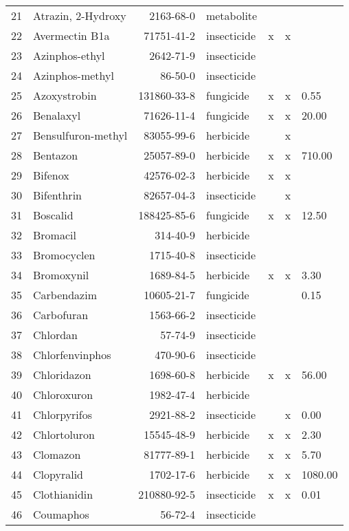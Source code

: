 \begin{longtable}{lp{3cm}rlp{0.5cm}p{0.5cm}p{1cm}}
  21 & Atrazin, 2-Hydroxy & 2163-68-0 & metabolite &  &  &  \\ 
  22 & Avermectin B1a & 71751-41-2 & insecticide & x & x &  \\ 
  23 & Azinphos-ethyl & 2642-71-9 & insecticide &  &  &  \\ 
  24 & Azinphos-methyl & 86-50-0 & insecticide &  &  &  \\ 
  25 & Azoxystrobin & 131860-33-8 & fungicide & x & x & 0.55 \\ 
  26 & Benalaxyl & 71626-11-4 & fungicide & x & x & 20.00 \\ 
  27 & Bensulfuron-methyl & 83055-99-6 & herbicide &  & x &  \\ 
  28 & Bentazon & 25057-89-0 & herbicide & x & x & 710.00 \\ 
  29 & Bifenox & 42576-02-3 & herbicide & x & x &  \\ 
  30 & Bifenthrin & 82657-04-3 & insecticide &  & x &  \\ 
  31 & Boscalid & 188425-85-6 & fungicide & x & x & 12.50 \\ 
  32 & Bromacil & 314-40-9 & herbicide &  &  &  \\ 
  33 & Bromocyclen & 1715-40-8 & insecticide &  &  &  \\ 
  34 & Bromoxynil & 1689-84-5 & herbicide & x & x & 3.30 \\ 
  35 & Carbendazim & 10605-21-7 & fungicide &  &  & 0.15 \\ 
  36 & Carbofuran & 1563-66-2 & insecticide &  &  &  \\ 
  37 & Chlordan & 57-74-9 & insecticide &  &  &  \\ 
  38 & Chlorfenvinphos & 470-90-6 & insecticide &  &  &  \\ 
  39 & Chloridazon & 1698-60-8 & herbicide & x & x & 56.00 \\ 
  40 & Chloroxuron & 1982-47-4 & herbicide &  &  &  \\ 
  41 & Chlorpyrifos & 2921-88-2 & insecticide &  & x & 0.00 \\ 
  42 & Chlortoluron & 15545-48-9 & herbicide & x & x & 2.30 \\ 
  43 & Clomazon & 81777-89-1 & herbicide & x & x & 5.70 \\ 
  44 & Clopyralid & 1702-17-6 & herbicide & x & x & 1080.00 \\ 
  45 & Clothianidin & 210880-92-5 & insecticide & x & x & 0.01 \\ 
  46 & Coumaphos & 56-72-4 & insecticide &  &  &  \\ 

\end{longtable}

